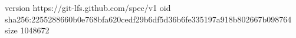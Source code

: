 version https://git-lfs.github.com/spec/v1
oid sha256:2255288660b0e768bfa620cedf29b6df5d36b6fe335197a918b802667b098764
size 1048672
